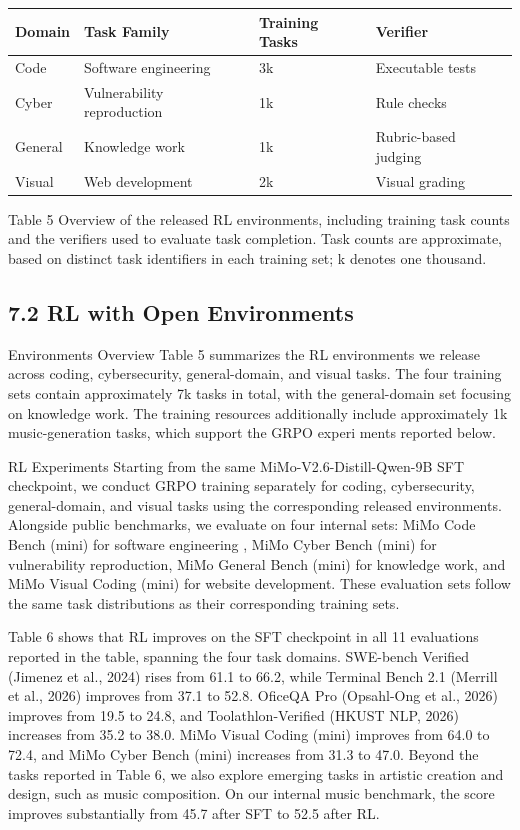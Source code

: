 \documentclass[
  10
]{article}
\newcounter{none} %
\begin{document}
{\def\LTcaptype{none} %
\begin{longtable}[]{@{}|l|l|l|l|@{}}
\toprule\noalign{}
\endhead
\bottomrule\noalign{}
\endlastfoot
\hline
Domain & Task Family & Training Tasks & Verifier \\
\hline
Code & Software engineering & 3k & Executable tests \\
\hline
Cyber & Vulnerability reproduction & 1k & Rule checks \\
\hline
General & Knowledge work & 1k & Rubric-based judging \\
\hline
Visual & Web development & 2k & Visual grading \\
\hline
\end{longtable}
}

Table 5 Overview of the released RL environments, including training
task counts and the verifiers used to evaluate task completion. Task
counts are approximate, based on distinct task identifiers in each
training set; k denotes one thousand.

\subsection{7.2 RL with Open
Environments}\label{rl-with-open-environments}

Environments Overview Table 5 summarizes the RL environments we release
across coding, cybersecurity, general-domain, and visual tasks. The four
training sets contain approximately 7k tasks in total, with the
general-domain set focusing on knowledge work. The training resources
additionally include approximately 1k music-generation tasks, which
support the GRPO experi ments reported below.

RL Experiments Starting from the same MiMo-V2.6-Distill-Qwen-9B SFT
checkpoint, we conduct GRPO training separately for coding,
cybersecurity, general-domain, and visual tasks using the corresponding
released environments. Alongside public benchmarks, we evaluate on four
internal sets: MiMo Code Bench (mini) for software engineering , MiMo
Cyber Bench (mini) for vulnerability reproduction, MiMo General Bench
(mini) for knowledge work, and MiMo Visual Coding (mini) for website
development. These evaluation sets follow the same task distributions as
their corresponding training sets.

Table 6 shows that RL improves on the SFT checkpoint in all 11
evaluations reported in the table, spanning the four task domains.
SWE-bench Verified (Jimenez et al., 2024) rises from 61.1 to 66.2, while
Terminal Bench 2.1 (Merrill et al., 2026) improves from 37.1 to 52.8.
OficeQA Pro (Opsahl-Ong et al., 2026) improves from 19.5 to 24.8, and
Toolathlon-Verified (HKUST NLP, 2026) increases from 35.2 to 38.0. MiMo
Visual Coding (mini) improves from 64.0 to 72.4, and MiMo Cyber Bench
(mini) increases from 31.3 to 47.0. Beyond the tasks reported in Table
6, we also explore emerging tasks in artistic creation and design, such
as music composition. On our internal music benchmark, the score
improves substantially from 45.7 after SFT to 52.5 after RL.
\end{document}
